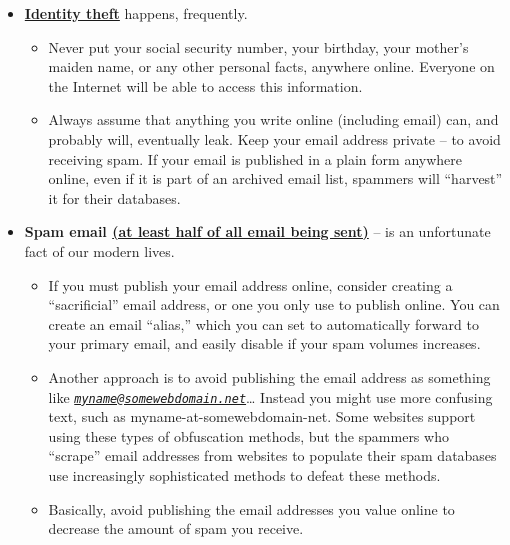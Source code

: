 \documentclass[
]{book}
\providecommand{\tightlist}{%
  \setlength{\itemsep}{0pt}\setlength{\parskip}{0pt}}
\theoremstyle{definition}
\theoremstyle{definition}
\theoremstyle{definition}
\theoremstyle{definition}
\theoremstyle{remark}
\begin{document}
\begin{itemize}
\tightlist
\item
  \href{https://en.wikipedia.org/wiki/Identity_theft}{\textbf{Identity theft}} happens, frequently.

  \begin{itemize}
  \tightlist
  \item
    Never put your social security number, your birthday, your mother's maiden name, or any other personal facts, anywhere online. Everyone on the Internet will be able to access this information.\\
  \item
    Always assume that anything you write online (including email) can, and probably will, eventually leak. Keep your email address private -- to avoid receiving spam. If your email is published in a plain form anywhere online, even if it is part of an archived email list, spammers will ``harvest'' it for their databases.\\
  \end{itemize}
\item
  \textbf{Spam email \href{https://securelist.com/spam-report-2019/96527/}{(at least half of all email being sent)}} -- is an unfortunate fact of our modern lives.

  \begin{itemize}
  \tightlist
  \item
    If you must publish your email address online, consider creating a ``sacrificial'' email address, or one you only use to publish online. You can create an email ``alias,'' which you can set to automatically forward to your primary email, and easily disable if your spam volumes increases.\\
  \item
    Another approach is to avoid publishing the email address as something like \emph{\href{mailto:myname@somewebdomain.net}{\nolinkurl{myname@somewebdomain.net}}}\ldots{} Instead you might use more confusing text, such as myname-at-somewebdomain-net. Some websites support using these types of obfuscation methods, but the spammers who ``scrape'' email addresses from websites to populate their spam databases use increasingly sophisticated methods to defeat these methods.\\
  \item
    Basically, avoid publishing the email addresses you value online to decrease the amount of spam you receive.
  \end{itemize}
\end{itemize}
\end{document}
